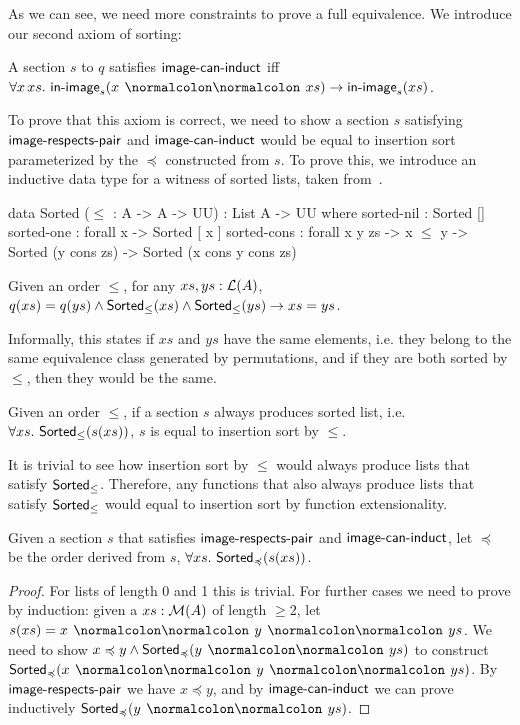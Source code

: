 As we can see, we need more constraints to prove a full equivalence.
We introduce our second axiom of sorting:
\begin{definition}
    A section $s$ to $q$ satisfies $\operatorname{\mathsf{image-can-induct}}$ iff
    $\forall x\,xs.\,\issorted(x \cons xs) \to \issorted(xs)$.
\end{definition}

To prove that this axiom is correct, we need to show a section $s$ satisfying
$\operatorname{\mathsf{image-respects-pair}}$ and $\operatorname{\mathsf{image-can-induct}}$ would be equal to insertion sort parameterized by
the $\preccurlyeq$ constructed from $s$. To prove this, we introduce an inductive data type
for a witness of sorted lists, taken from~\cite{appelVerifiedFunctionalAlgorithms2023}.

\begin{code}
data Sorted ($\leq$ : A -> A -> UU) : List A -> UU where
  sorted-nil : Sorted []
  sorted-one : forall x -> Sorted [ x ]
  sorted-cons : forall x y zs -> x $\leq$ y
     -> Sorted (y cons zs) -> Sorted (x cons y cons zs)
\end{code}

\begin{proposition}
    Given an order $\leq$, for any $xs, ys : \mathcal{L}(A)$,
    $q(xs) = q(ys) \land \operatorname{\mathsf{Sorted}}_{\leq}(xs) \land \operatorname{\mathsf{Sorted}}_{\leq}(ys) \to xs = ys$.
\end{proposition}

Informally, this states if $xs$ and $ys$ have the same elements, i.e. they belong to the same
equivalence class generated by permutations, and if they are both sorted by $\leq$, then they would be the same.

\begin{corollary}\label{sort:sort-uniq}
    Given an order $\leq$,
    if a section $s$ always produces sorted list, i.e. $\forall xs.\,\operatorname{\mathsf{Sorted}}_{\leq}(s(xs))$,
    $s$ is equal to insertion sort by $\leq$.
\end{corollary}
It is trivial to see how insertion sort by $\leq$ would always produce lists that satisfy
$\operatorname{\mathsf{Sorted}}_{\leq}$. Therefore, any functions that also always produce lists that satisfy
$\operatorname{\mathsf{Sorted}}_{\leq}$ would equal to insertion sort by function extensionality.

\begin{corollary}\label{sort:well-behave-sorts}
    Given a section $s$ that satisfies $\operatorname{\mathsf{image-respects-pair}}$ and $\operatorname{\mathsf{image-can-induct}}$,
    let $\preccurlyeq$ be the order derived from $s$,
    $\forall xs.\,\operatorname{\mathsf{Sorted}}_{\preccurlyeq}(s(xs))$.
\end{corollary}
\begin{proof}
    For lists of length 0 and 1 this is trivial. For further cases we need to prove by induction:
    given a $xs : \mathcal{M}(A)$ of length $\geq 2$, let $s(xs) = x \cons y \cons ys$. We need to show
    $x \preccurlyeq y \land \term{Sorted}_{\preccurlyeq}(y \cons ys)$ to construct
    $\term{Sorted}_{\preccurlyeq}(x \cons y \cons ys)$.
    By $\operatorname{\mathsf{image-respects-pair}}$ we have $x \preccurlyeq y$, and by $\operatorname{\mathsf{image-can-induct}}$ we can prove
    inductively $\term{Sorted}_{\preccurlyeq}(y \cons ys)$.
\end{proof}

